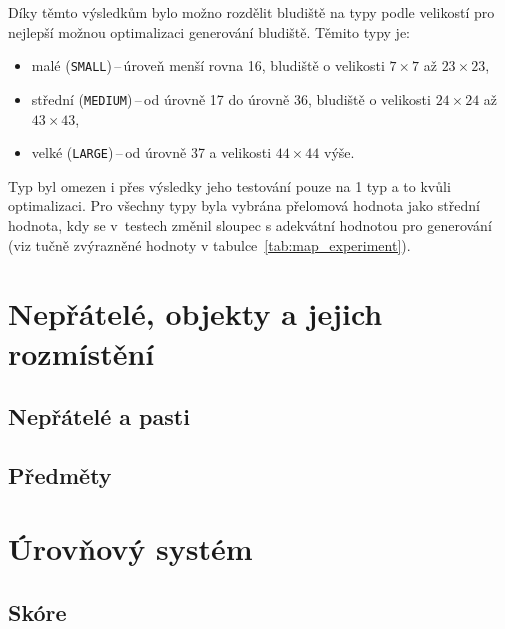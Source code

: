 Díky těmto výsledkům bylo možno rozdělit bludiště na typy podle velikostí pro nejlepší možnou optimalizaci generování bludiště. Těmito typy je:
\begin{itemize}
    \item  malé (\verb|SMALL|)\,--\,úroveň menší rovna 16, bludiště o velikosti $7 \times 7$ až $23 \times 23$,
    \item střední (\verb|MEDIUM|)\,--\,od úrovně 17 do úrovně 36, bludiště o velikosti $24 \times 24$ až $43 \times 43$,
    \item velké (\verb|LARGE|)\,--\,od úrovně 37 a velikosti $44 \times 44 $ výše.
\end{itemize}

Typ  byl omezen i přes výsledky jeho testování pouze na 1 typ a to kvůli optimalizaci. Pro všechny typy byla vybrána přelomová hodnota jako střední hodnota, kdy se v~testech změnil sloupec s adekvátní hodnotou pro generování (viz tučně zvýrazněné hodnoty v tabulce~\ref{tab:map_experiment}).

\section{Nepřátelé, objekty a jejich rozmístění}

\subsection*{Nepřátelé a pasti}

\subsection*{Předměty}

\section{Úrovňový systém}

\subsection*{Skóre}

